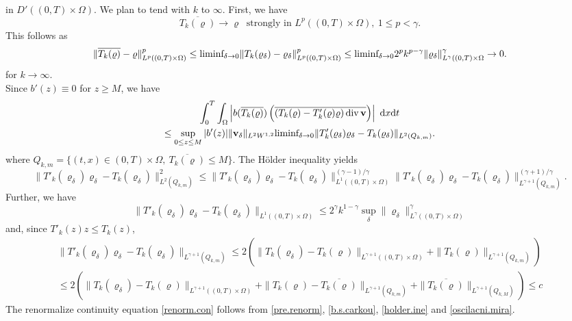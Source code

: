 \documentclass{article}
\DeclareMathOperator{\diver}{div}
\newcommand{\bv}{{\bf v}}
\newcommand{\vv}{\bv}
\numberwithin{equation}{section}
\begin{document}
in $D'((0,T)\times \Omega)$. We plan to tend with $k$ to $\infty$. First, we have
$$
\overline{T_k(\varrho)}\to \varrho \ \mbox{ strongly in }L^p((0,T)\times\Omega),\ 1\leq p<\gamma.
$$
This follows as
\begin{equation*}
\|\overline{T_k(\varrho)} - \varrho\|^p_{L^p((0,T)\times\Omega)}\leq \mbox{liminf}_{\delta\to 0} \|T_k(\varrho_\delta) - \varrho_\delta\|_{L^p((0,T)\times\Omega)}^p\\
\leq \mbox{liminf}_{\delta\to 0} 2^pk^{p-\gamma}\|\varrho_\delta\|_{L^\gamma((0,T)\times\Omega}^\gamma\to 0.
\end{equation*}
for $k\to\infty$.\\
Since $b'(z) \equiv  0$ for $z\geq M$, we have
\begin{multline}\label{b.s.carkou}
\int_0^T\int_\Omega \left|b(\overline{T_k(\varrho)}) \left(\overline{(T_k(\varrho) - T'_k(\varrho)\varrho   )\diver \vv}\right)\right|\ {\rm d}x{\rm d}t \\
%
\leq  \sup_{0\leq z\leq M} |b'(z)| \|\vv_\delta\|_{L^2W^{1,2}} \mbox{liminf}_{\delta\to 0} \|T'_k(\varrho_\delta)\varrho_\delta - T_k(\varrho_\delta)\|_{L^2(Q_{k,m})}.
\end{multline}
where $Q_{k,m} = \{(t,x)\in (0,T)\times \Omega,\ \overline{T_k(\varrho)}\leq M\}$. The H\"older inequality yields
\begin{equation}\label{holder.ine}
\|T'_k(\varrho_\delta)\varrho_\delta - T_k(\varrho_\delta)\|_{L^2(Q_{k,m})}^2
\leq \|T'_k(\varrho_\delta)\varrho_\delta - T_k(\varrho_\delta)\|_{L^1((0,T)\times\Omega)}^{(\gamma-1)/\gamma} \|T'_k(\varrho_\delta)\varrho_\delta - T_k(\varrho_\delta)\|_{L^{\gamma+1}(Q_{k,m})}^{(\gamma+1)/\gamma}.
\end{equation}
Further, we have 
$$
\|T'_k(\varrho_\delta)\varrho_\delta - T_k(\varrho_\delta)\|_{L^1((0,T)\times\Omega)} \leq 2^\gamma k^{1-\gamma} \sup_{\delta} \|\varrho_\delta\|_{L^\gamma((0,T)\times\Omega)}^\gamma
$$
and, since $T'_k(z) z \leq T_k(z)$,
\begin{multline}
\|T'_k(\varrho_\delta)\varrho_\delta - T_k(\varrho_\delta)\|_{L^{\gamma+1}(Q_{k,m})}\leq 2\left(\|T_k(\varrho_\delta) - T_k(\varrho)\|_{L^{\gamma+1}((0,T)\times\Omega)} + \|T_k(\varrho)\|_{L^{\gamma+1}(Q_{k,m})}\right)\\
%
\leq 2\left(\|T_k(\varrho_\delta) - T_k(\varrho)\|_{L^{\gamma+1}((0,T)\times\Omega)} + \|T_k(\varrho) - \overline{T_k(\varrho)}\|_{L^{\gamma+1}(Q_{k,m})} + \|\overline{T_k(\varrho)}\|_{L^{\gamma+1}(Q_{k,M})}\right) \leq c\label{oscilacni.mira}
\end{multline}
The renormalize continuity equation \eqref{renorm.con} follows from \eqref{pre.renorm}, \eqref{b.s.carkou}, \eqref{holder.ine} and \eqref{oscilacni.mira}.
\end{document}
